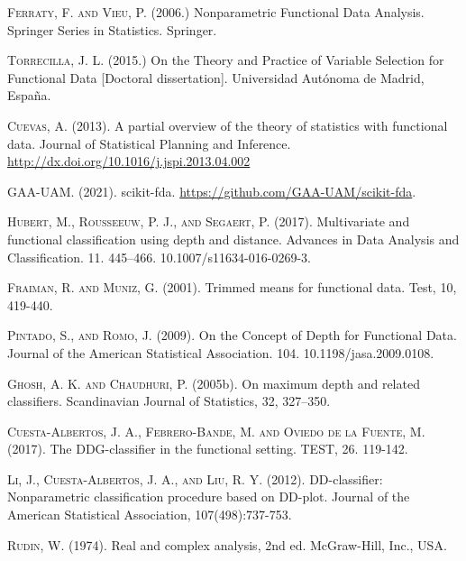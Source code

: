 \documentclass[a4paper,oneside,11pt,leqno]{article}
\begin{document}
\begin{enumerate}
\begin{thebibliography}{10}
                  \textsc{Ferraty, F. and Vieu, P.} (2006.) Nonparametric Functional Data Analysis.
                  Springer Series in Statistics. Springer.

                  \textsc{Torrecilla, J. L.} (2015.) On the Theory and Practice of Variable
                  Selection for Functional Data [Doctoral dissertation]. Universidad Autónoma de Madrid, España.

                  \textsc{Cuevas, A.} (2013). A partial overview of the theory of statistics with functional data.
                  Journal of Statistical Planning and Inference. \url{http://dx.doi.org/10.1016/j.jspi.2013.04.002}

                  \textsc{GAA-UAM.} (2021). scikit-fda. \url{https://github.com/GAA-UAM/scikit-fda}.

                  \textsc{Hubert, M., Rousseeuw, P. J., and Segaert, P.} (2017).
                  Multivariate and functional classification using depth and distance.
                  Advances in Data Analysis and Classification. 11. 445–466. 10.1007/s11634-016-0269-3.

                  \textsc{Fraiman, R. and Muniz, G.} (2001). Trimmed means for functional
                  data. Test, 10, 419-440.

                  \textsc{Pintado, S., and Romo, J.} (2009). On the Concept of Depth for Functional Data.
                  Journal of the American Statistical Association. 104. 10.1198/jasa.2009.0108.

                  \textsc{Ghosh, A. K. and Chaudhuri, P.} (2005b). On maximum depth and
                  related classifiers. Scandinavian Journal of Statistics, 32, 327–350.

                  \textsc{Cuesta-Albertos, J. A., Febrero-Bande, M. and Oviedo de la Fuente, M.}
                  (2017). The DDG-classifier in the functional setting. TEST, 26. 119-142.

                  \textsc{Li, J., Cuesta-Albertos, J. A., and Liu, R. Y.} (2012).
                  DD-classifier: Nonparametric classification procedure based on DD-plot.
                  Journal of the American Statistical Association, 107(498):737-753.

                  \textsc{Rudin, W.} (1974).
                  Real and complex analysis, 2nd ed. McGraw-Hill, Inc., USA.

            \end{thebibliography}


\end{enumerate}
\end{document}
